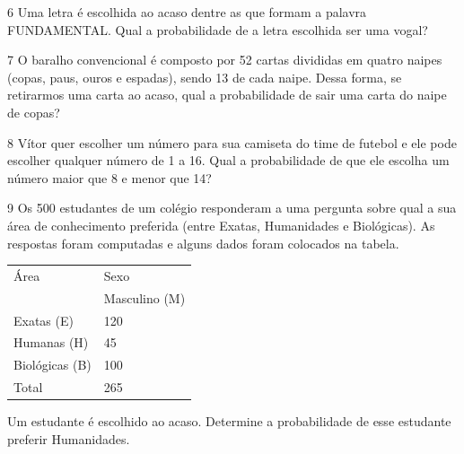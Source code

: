 \num{6} Uma letra é escolhida ao acaso dentre as que formam a palavra
FUNDAMENTAL. Qual a probabilidade de a letra escolhida ser uma vogal?

\begin{emptybox}
\end{emptybox}

\pagebreak
\num{7} O baralho convencional é composto por 52 cartas divididas em quatro
naipes (copas, paus, ouros e espadas), sendo 13 de cada naipe. Dessa
forma, se retirarmos uma carta ao acaso, qual a probabilidade de sair
uma carta do naipe de copas?

\begin{emptybox}
\vspace{6cm}
\end{emptybox}

\num{8} Vítor quer escolher um número para sua camiseta do time de futebol
e ele pode escolher qualquer número de 1 a 16. Qual a probabilidade de
que ele escolha um número maior que 8 e menor que 14?

\begin{emptybox}
\vspace{6cm}
\end{emptybox}

\pagebreak
\num{9} Os 500 estudantes de um colégio responderam a uma pergunta sobre
qual a sua área de conhecimento preferida (entre Exatas, Humanidades e
Biológicas). As respostas foram computadas e alguns dados foram colocados
na tabela.

\begin{longtable}[]{@{}ll@{}}
\toprule
Área & Sexo\tabularnewline
& Masculino (M)\tabularnewline
Exatas (E) & 120\tabularnewline
Humanas (H) & 45\tabularnewline
Biológicas (B) & 100\tabularnewline
Total & 265\tabularnewline
\bottomrule
\end{longtable}

Um estudante é escolhido ao acaso. Determine a probabilidade de esse
estudante preferir Humanidades.

